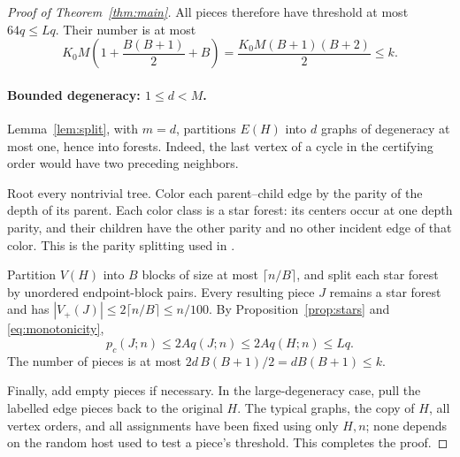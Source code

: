 \documentclass[11pt]{article}
\theoremstyle{remark}
\numberwithin{equation}{section}
\begin{document}
\begin{proof}[Proof of Theorem~\ref{thm:main}]
All pieces therefore have threshold at most $64q\leq Lq$.
Their number is at most
\[
 K_0M\left(1+\frac{B(B+1)}2+B\right)
 =\frac{K_0M(B+1)(B+2)}2\leq k.
\]

\paragraph{Bounded degeneracy: $1\leq d<M$.}
Lemma~\ref{lem:split}, with $m=d$, partitions $E(H)$ into
$d$ graphs of degeneracy at most one, hence into forests.
Indeed, the last vertex of a cycle in the certifying order
would have two preceding neighbors.

Root every nontrivial tree. Color each parent--child edge by
the parity of the depth of its parent. Each color class is a
star forest: its centers occur at one depth parity, and their
children have the other parity and no other incident edge of
that color. This is the parity splitting used in
\cite[Claim~6.2]{AHPT26}.

Partition $V(H)$ into $B$ blocks of size at most
$\lceil n/B\rceil$, and split each star forest by unordered
endpoint-block pairs. Every resulting piece $J$ remains a star
forest and has
$|V_+(J)|\leq2\lceil n/B\rceil\leq n/100$.
By Proposition~\ref{prop:stars} and \eqref{eq:monotonicity},
\[
 p_c(J;n)\leq2Aq(J;n)\leq2Aq(H;n)\leq Lq.
\]
The number of pieces is at most
$2d\,B(B+1)/2=dB(B+1)\leq k$.

Finally, add empty pieces if necessary. In the large-degeneracy
case, pull the labelled edge pieces back to the original $H$.
The typical graphs, the copy of $H$, all vertex orders, and
all assignments have been fixed using only $H,n$; none depends
on the random host used to test a piece's threshold. This
completes the proof.
\end{proof}



\end{document}
